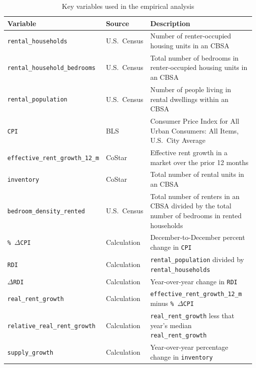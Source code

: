 \documentclass[pdflatex,sn-apa]{sn-jnl}%
\theoremstyle{thmstyleone}%
\theoremstyle{thmstyletwo}%
\theoremstyle{thmstylethree}%
\begin{document}
\setlength{\tabcolsep}{4pt} %
\begin{table}[htbp]	\centering
	\caption{Key variables used in the empirical analysis}
	\label{tab:variables}
	\begin{tabularx}{\textwidth}{@{}l l X@{}}
		\toprule
		\textbf{Variable} & \textbf{Source} & \textbf{Description} \\
		\midrule
		\texttt{rental\_households} & U.S.\ Census & Number of renter-occupied housing units in an CBSA \\
		\texttt{rental\_household\_bedrooms} & U.S.\ Census & Total number of bedrooms in renter-occupied housing units in an CBSA \\
		\texttt{rental\_population} & U.S.\ Census & Number of people living in rental dwellings within an CBSA \\
		\texttt{CPI} & BLS & Consumer Price Index for All Urban Consumers: All Items, U.S.\ City Average \\
		\texttt{effective\_rent\_growth\_12\_m} & CoStar & Effective rent growth in a market over the prior 12 months \\
		\texttt{inventory} & CoStar & Total number of rental units in an CBSA \\
		\texttt{bedroom\_density\_rented} & U.S.\ Census & Total number of renters in an CBSA divided by the total number of bedrooms in rented households \\
		\texttt{\%\,$\Delta$CPI} & Calculation & December-to-December percent change in \texttt{CPI} \\
		\texttt{RDI} & Calculation & \texttt{rental\_population} divided by \texttt{rental\_households} \\
		\texttt{$\Delta$RDI} & Calculation & Year-over-year change in \texttt{RDI} \\
		\texttt{real\_rent\_growth} & Calculation & \texttt{effective\_rent\_growth\_12\_m} minus \texttt{\%\,$\Delta$CPI} \\
		\texttt{relative\_real\_rent\_growth} & Calculation & \texttt{real\_rent\_growth} less that year’s median \texttt{real\_rent\_growth} \\
		\texttt{supply\_growth} & Calculation & Year-over-year percentage change in \texttt{inventory} \\
		\bottomrule
	\end{tabularx}
\end{table}
\end{document}

